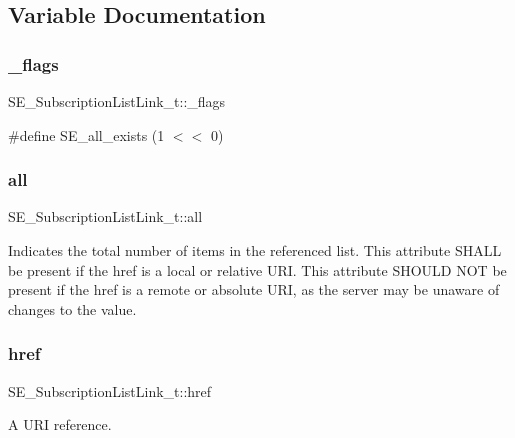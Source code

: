 \subsection{Variable Documentation}
\mbox{\label{group__SubscriptionListLink_ga93d00f33f2e0e65549237fbf178db546}} 
\subsubsection{\texorpdfstring{\+\_\+flags}{\_flags}}
{\footnotesize\ttfamily S\+E\+\_\+\+Subscription\+List\+Link\+\_\+t\+::\+\_\+flags}

\#define S\+E\+\_\+all\+\_\+exists (1 $<$$<$ 0) \mbox{\label{group__SubscriptionListLink_gac6bb6b67f2a885facd387ad84674a74b}} 
\subsubsection{\texorpdfstring{all}{all}}
{\footnotesize\ttfamily S\+E\+\_\+\+Subscription\+List\+Link\+\_\+t\+::all}

Indicates the total number of items in the referenced list. This attribute S\+H\+A\+LL be present if the href is a local or relative U\+RI. This attribute S\+H\+O\+U\+LD N\+OT be present if the href is a remote or absolute U\+RI, as the server may be unaware of changes to the value. \mbox{\label{group__SubscriptionListLink_ga6a3870736e354e4a3b367859752e47e7}} 
\subsubsection{\texorpdfstring{href}{href}}
{\footnotesize\ttfamily S\+E\+\_\+\+Subscription\+List\+Link\+\_\+t\+::href}

A U\+RI reference. 